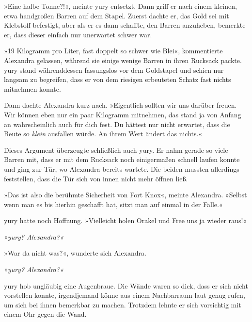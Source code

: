 »Eine halbe Tonne?!«, meinte yury entsetzt. Dann griff er nach einem kleinen, etwa handgroßen Barren auf dem Stapel. Zuerst dachte er, das Gold sei mit Klebstoff befestigt, aber als er es dann schaffte, den Barren anzuheben, bemerkte er, dass dieser einfach nur unerwartet schwer war.

»19 Kilogramm pro Liter, fast doppelt so schwer wie Blei«, kommentierte Alexandra gelassen, während sie einige wenige Barren in ihren Rucksack packte. yury stand währenddessen fassungslos vor dem Goldstapel und schien nur langsam zu begreifen, dass er von dem riesigen erbeuteten Schatz fast nichts mitnehmen konnte.

Dann dachte Alexandra kurz nach. »Eigentlich sollten wir uns darüber freuen. Wir können eben nur ein paar Kilogramm mitnehmen, das stand ja von Anfang an wahrscheinlich auch für dich fest. Du hättest nur nicht erwartet, dass die Beute so \emph{klein} ausfallen würde. An ihrem Wert ändert das nichts.«

Dieses Argument überzeugte schließlich auch yury. Er nahm gerade so viele Barren mit, dass er mit dem Rucksack noch einigermaßen schnell laufen konnte und ging zur Tür, wo Alexandra bereits wartete. Die beiden mussten allerdings feststellen, dass die Tür sich von innen nicht mehr öffnen ließ.

»Das ist also die berühmte Sicherheit von Fort Knox«, meinte Alexandra. »Selbst wenn man es bis hierhin geschafft hat, sitzt man auf einmal in der Falle.«

yury hatte noch Hoffnung. »Vielleicht holen Orakel und Free uns ja wieder raus!«

    \begin{tiny} %

\textit{»yury? Alexandra?«}

    \end{tiny}

»War da nicht was?«, wunderte sich Alexandra.

    \begin{scriptsize}

\textit{»yury? Alexandra?«}

    \end{scriptsize}

yury hob ungläubig eine Augenbraue. Die Wände waren so dick, dass er sich nicht vorstellen konnte, irgendjemand könne aus einem Nachbarraum laut genug rufen, um sich bei ihnen bemerkbar zu machen. Trotzdem lehnte er sich vorsichtig mit einem Ohr gegen die Wand.


